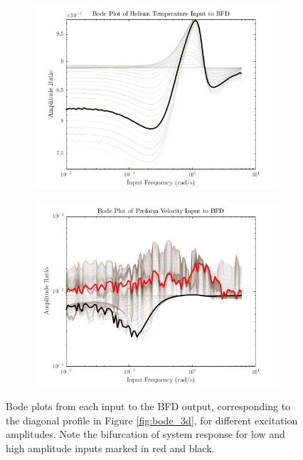 \begin{figure}[ht]
    \begin{subfigure}[b]{0.49\textwidth}
        \centering
        \includegraphics[width=\textwidth]{figures/bode_profile3.png}
    \end{subfigure}
    \hfill
    \begin{subfigure}[b]{0.49\textwidth}
        \centering
        \includegraphics[width=\textwidth]{figures/bode_profile4.png}
    \end{subfigure}
    
    \caption{Bode plots from each input to the BFD output, corresponding to the diagonal profile in Figure \ref{fig:bode_3d}, for different excitation amplitudes. Note the bifurcation of system response for low and high amplitude inputs marked in red and black. }
    \label{fig:bode_profile}
\end{figure}

